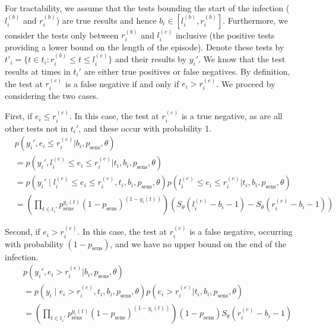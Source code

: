 \documentclass[thesis.tex]{subfiles}
\begin{document}
For tractability, we assume that the tests bounding the start of the
infection ($l_i^{(b)}$ and $r_i^{(b)}$) are true results and hence
$b_i \in [l_i^{(b)}, r_i^{(b)}]$. Furthermore, we consider the tests
only between $r_i^{(b)}$ and $l_i^{(e)}$ inclusive (the positive
tests providing a lower bound on the length of the episode). Denote
these tests by
$t'_i = \{ t \in t_i : r_i^{(b)} \leq t \leq l_i^{(e)} \}$ and their
results by $y_i'$. We know that the test results at times in $t_i'$
are either true positives or false negatives. By definition, the test at
$r_i^{(e)}$ is a false negative if and only if $e_i > r_i^{(e)}$. We
proceed by considering the two cases.

First, if $e_i \leq r_i^{(e)}$. In this case, the test at
$r_i^{(e)}$ is a true negative, as are all other tests not in
$t_i'$, and these occur with probability 1.
\begin{align}
&p(y_i', e_i \leq r_i^{(e)} | b_i, p_\text{sens}, \theta) \\
&= p(y_i', l_i^{(e)} \leq e_i \leq r_i^{(e)} | t_i, b_i, p_\text{sens}, \theta) \\ %
&= p(y_i' \mid l_i^{(e)} \leq e_i \leq r_i^{(e)}, t_i, b_i, p_\text{sens}, \theta) p(l_i^{(e)} \leq e_i \leq r_i^{(e)} | t_i, b_i, p_\text{sens}, \theta) \\
&= \left( \prod_{t \in t_i'} p_\text{sens}^{y_i(t)} (1 - p_\text{sens})^{(1 - y_i(t))} \right) \left( S_\theta(l_i^{(e)} - b_i - 1) - S_\theta(r_i^{(e)} - b_i - 1) \right)
\end{align}

Second, if $e_i > r_i^{(e)}$. In this case, the test at
$r_i^{(e)}$ is a false negative, occurring with probability
$(1 - p_\text{sens})$, and we have no upper bound on the end of the
infection.
\begin{align}
&p(y_i', e_i > r_i^{(e)} | b_i, p_\text{sens}, \theta) \\
&= p(y_i \mid e_i > r_i^{(e)}, t_i, b_i, p_\text{sens}, \theta) p(e_i > r_i^{(e)} | t_i, b_i, p_\text{sens}, \theta) \\
&= \left( \prod_{t \in t_i'} p_\text{sens}^{y_i(t)} (1 - p_\text{sens})^{(1 - y_i(t))} \right) (1 - p_\text{sens}) S_\theta(r_i^{(e)} - b_i - 1)
\end{align}
\end{document}
